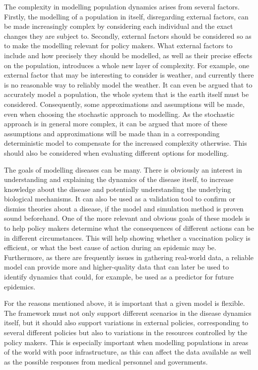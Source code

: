 \documentclass[10pt,a4paper]{article}
\begin{document}
The complexity in modelling population dynamics arises from several factors. Firstly, the modelling of a population in itself, disregarding external factors, can be made increasingly complex by considering each individual and the exact changes they are subject to. Secondly, external factors should be considered so as to make the modelling relevant for policy makers. What external factors to include and how precisely they should be modelled, as well as their precise effects on the population, introduces a whole new layer of complexity. For example, one external factor that may be interesting to consider is weather, and currently there is no reasonable way to reliably model the weather. It can even be argued that to accurately model a population, the whole system that is the earth itself must be considered. Consequently, some approximations and assumptions will be made, even when choosing the stochastic approach to modelling. As the stochastic approach is in general more complex, it can be argued that more of these assumptions and approximations will be made than in a corresponding deterministic model to compensate for the increased complexity otherwise. This should also be considered when evaluating different options for modelling.

The goals of modelling diseases can be many. There is obviously an interest in understanding and explaining the dynamics of the disease itself, to increase knowledge about the disease and potentially understanding the underlying biological mechanisms. It can also be used as a validation tool to confirm or dismiss theories about a disease, if the model and simulation method is proven sound beforehand. One of the more relevant and obvious goals of these models is to help policy makers determine what the consequences of different actions can be in different circumstances. This will help showing whether a vaccination policy is efficient, or what the best cause of action during an epidemic may be. Furthermore, as there are frequently issues in gathering real-world data, a reliable model can provide more and higher-quality data that can later be used to identify dynamics that could, for example, be used as a predictor for future epidemics.

For the reasons mentioned above, it is important that a given model is flexible. The framework must not only support different scenarios in the disease dynamics itself, but it should also support variations in external policies, corresponding to several different policies but also to variations in the resources controlled by the policy makers. This is especially important when modelling populations in areas of the world with poor infrastructure, as this can affect the data available as well as the possible responses from medical personnel and governments.
\end{document}
